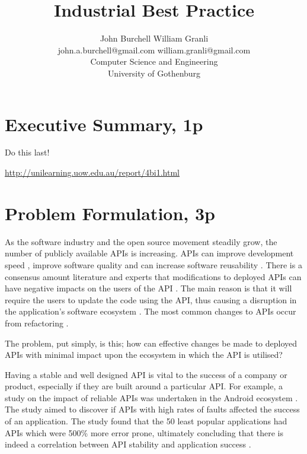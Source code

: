 \documentclass{article}
\title{Industrial Best Practice}
\begin{document}
\author{John Burchell \qquad William Granli \\
		john.a.burchell@gmail.com \qquad william.granli@gmail.com \\
		Computer Science and Engineering  \\
		University of Gothenburg }



\maketitle
\section{Executive Summary, 1p}
Do this last! 

\url{http://unilearning.uow.edu.au/report/4bi1.html}

\section{Problem Formulation, 3p}

As the software industry and the open source movement steadily grow, the number of publicly available APIs is increasing. APIs can improve development speed \cite{stylos2006comparing}, improve software quality \cite{stylos2006comparing} and can increase software reusability \cite{afonso2012evaluating}. There is a consensus amount literature and experts that modifications to deployed APIs can have negative impacts on the users of the API \cite{google_talk} \cite{mcdonnell2013empirical} \cite{robbes2012developers} \cite{henning2007api}. The main reason is that it will require the users to update the code using the API, thus causing a disruption in the application's software ecosystem \cite{messerschmitt2005software}. The most common changes to APIs occur from refactoring \cite{dig2005role} \cite{xing2006refactoring}.

The problem, put simply, is this; how can effective changes be made to deployed APIs with minimal impact upon the ecosystem in which the API is utilised?

Having a stable and well designed API is vital to the success of a company or product, especially if they are built around a particular API. For example, a study on the impact of reliable APIs was undertaken in the Android ecosystem \cite{mcdonnell2013empirical}. The study aimed to discover if APIs with high rates of faults affected the success of an application. The study found that the 50 least popular applications had APIs which were 500\% more error prone, ultimately concluding that there is indeed a correlation between API stability and application success \cite{mcdonnell2013empirical}. 
\end{document}
